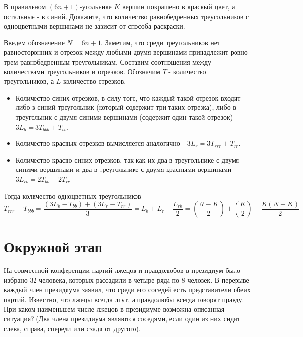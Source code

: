 \documentclass[11pt, a4paper]{common/document_template}
\begin{document}
\begin{exercise}
В правильном $(6n+1)$-угольнике $K$ вершин покрашено в красный цвет, а остальные - в синий. 
Докажите, что количество равнобедренных треугольников с одноцветными вершинами не зависит от способа раскраски.
\end{exercise}

\begin{Solution}
Введем обозначение $N = 6n + 1$. Заметим, что среди треугольников нет равносторонних и отрезок между любыми двумя вершинами принадлежит ровно трем равнобедренным треугольникам. Составим соотношения между количествами треугольников и отрезков. Обозначим $T$ - количество треугольников, а $L$ количество отрезков.
\begin{itemize}
\item Количество синих отрезков, в силу того, что каждый такой отрезок входит либо в синий треугольник (который содержит три таких отрезка), либо в треугольник с двумя синими вершинами (содержит один такой отрезок) - $3L_{b} = 3 T_{bbb} + T_{bb}$.
\item Количество красных отрезков вычисляется аналогично - $3L_{r} = 3T_{rrr} + T_{rr}$.
\item Количество красно-синих отрезков, так как их два в треугольнике с двумя синими вершинами и два в треугольнике с двумя красными вершинами - $3L_{rb} = 2T_{bb}+2T_{rr}$
\end{itemize}
Тогда количество одноцветных треугольников
$$
T_{rrr} + T_{bbb} = \frac{(3L_{b} - T_{bb}) + (3L_{r} - T_{rr})}{3} = L_{b} + L_{r} - \frac{L_{rb}}{2} = \binom{N - K}{2} + \binom{K}{2} - \frac{K(N - K)}{2}
$$
\end{Solution}

\section{Окружной этап}

\begin{exercise}
На совместной конференции партий лжецов и правдолюбов в президиум было избрано 32 человека, которых рассадили в четыре ряда по 8 человек. 
В перерыве каждый член президиума заявил, что среди его соседей есть представители обеих партий.
Известно, что лжецы всегда лгут, а правдолюбы всегда говорят правду. При каком наименьшем числе лжецов в президиуме возможна описанная ситуация?
(Два члена президиума являются соседями, если один из них сидит слева, справа, спереди или сзади от другого).
\end{exercise}
\end{document}
